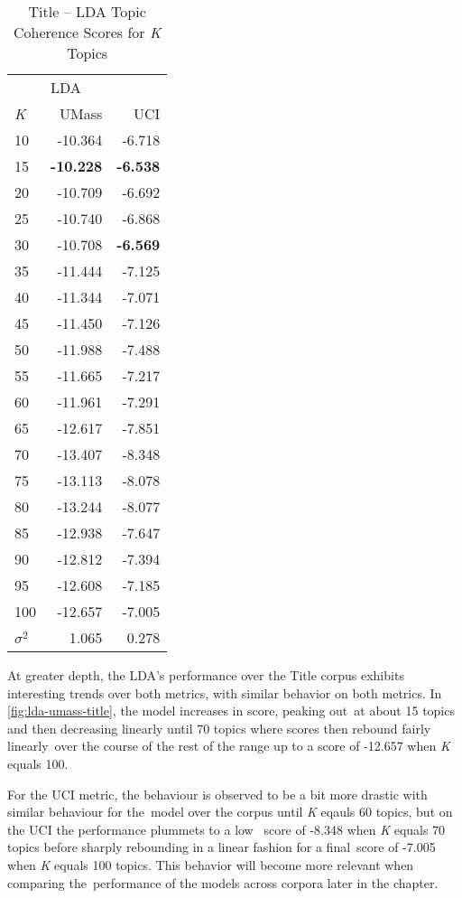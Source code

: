 \documentclass[letterpaper,12pt]{article}
\begin{document}
\begin{table}
	\caption{\label{tab:lda_title_tc} Title -- LDA Topic Coherence Scores for \emph{K} Topics}
	\begin{center}
		\begin{tabular}{lrr}
			\toprule
			{} & \multicolumn{2}{l}{LDA} \\
			\emph{K} &   UMass &    UCI \\
			\midrule
			10  & -10.364 & -6.718 \\
			15  & \textbf{-10.228} & \textbf{-6.538} \\
			20  & -10.709 & -6.692 \\
			25  & -10.740 & -6.868 \\
			30  & -10.708 & \textbf{-6.569} \\
			35  & -11.444 & -7.125 \\
			40  & -11.344 & -7.071 \\
			45  & -11.450 & -7.126 \\
			50  & -11.988 & -7.488 \\
			55  & -11.665 & -7.217 \\
			60  & -11.961 & -7.291 \\
			65  & -12.617 & -7.851 \\
			70  & -13.407 & -8.348 \\
			75  & -13.113 & -8.078 \\
			80  & -13.244 & -8.077 \\
			85  & -12.938 & -7.647 \\
			90  & -12.812 & -7.394 \\
			95  & -12.608 & -7.185 \\
			100 & -12.657 & -7.005 \\
			\midrule
			$\sigma^2$ & 1.065 & 0.278 \\
			\bottomrule
			\end{tabular}
	\end{center}
\end{table}

At greater depth, the LDA's performance over the Title corpus exhibits interesting trends over both metrics,
with similar behavior on both metrics. In \ref{fig:lda-umass-title}, the model increases in score, peaking out\
at about 15 topics and then decreasing linearly until 70 topics where scores then rebound fairly linearly\
over the course of the rest of the range up to a score of -12.657 when \emph{K} equals 100.

For the UCI metric, the behaviour is observed to be a bit more drastic with similar behaviour for the\
model over the corpus until \emph{K} eqauls 60 topics, but on the UCI the performance plummets to a low \
score of -8.348 when \emph{K} equals 70 topics before sharply rebounding in a linear fashion for a final\
score of -7.005 when \emph{K} equals 100 topics. This behavior will become more relevant when comparing the\
performance of the models across corpora later in the chapter.
\end{document}
